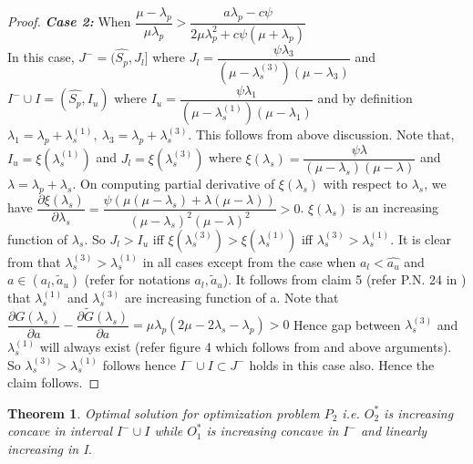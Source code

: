 \documentclass[12pt, a4paper]{report}
\newtheorem{thm}{Theorem}[chapter]
\begin{document}
\begin{proof}
\indent \textit{\textbf{Case 2:}} When $\dfrac{\mu -\lambda_p}{\mu \lambda_p} > \dfrac{a\lambda_p-c\psi}{2\mu \lambda_p^2+c\psi(\mu +\lambda_p)}$\\
In this case, $J^- = (\hat{S_p},J_l]$ where $J_l = \dfrac{\psi\lambda_3}{(\mu-\lambda_s^{(3)})(\mu-\lambda_3)}$ and $I^-\cup I = (\hat{S_p},I_u)$ where $I_u = \dfrac{\psi\lambda_1}{(\mu-\lambda_s^{(1)})(\mu-\lambda_1)} $ and by definition $\lambda_1 = \lambda_p + \lambda_s^{(1)},~ \lambda_3 = \lambda_p +\lambda_s^{(3)}$. This follows from above discussion. Note that, $I_u = \xi(\lambda_s^{(1)})$ and $J_l = \xi(\lambda_s^{(3)})$ where $\xi(\lambda_s) = \dfrac{\psi\lambda}{(\mu-\lambda_s)(\mu-\lambda)}$ and $\lambda = \lambda_p + \lambda_s$. On computing partial derivative of $\xi(\lambda_s)$ with respect to $\lambda_s$, we have $\dfrac{\partial\xi(\lambda_s)}{\partial\lambda_s}=\dfrac{\psi(\mu(\mu-\lambda_s)+\lambda(\mu - \lambda))}{(\mu - \lambda_s)^2(\mu - \lambda)^2} >0$. $\xi(\lambda_s)$ is an increasing function of $\lambda_s$. So $J_l > I_u$ iff $\xi(\lambda_s^{(3)})>\xi(\lambda_s^{(1)})$ iff $\lambda_s^{(3)}>\lambda_s^{(1)}$. It is clear from \cite{Sudhir_standard_style} that $\lambda_s^{(3)} > \lambda_s^{(1)}$ in all cases except from the case when $a_l<\hat{a_u}$ and $a\in (a_l,\tilde{a}_u)$ (refer \cite{Sudhir_standard_style} for notations $a_l, \tilde{a}_u$). It follows from claim 5 (refer P.N. 24 in \cite{Sudhir_standard_style}) that $\lambda_s^{(1)}$ and $\lambda_s^{(3)}$ are increasing function of a. Note that $\dfrac{\partial G(\lambda_s)}{\partial a} - \dfrac{\partial \tilde{G}(\lambda_s)}{\partial a} =\mu \lambda_p(2\mu - 2\lambda_s - \lambda_p) > 0 $ Hence gap between $\lambda_s^{(3)} $ and $ \lambda_s^{(1)}$ will always exist (refer figure 4 which follows from \cite{Sudhir_standard_style} and above arguments). So $\lambda_s^{(3)} > \lambda_s^{(1)}$ follows hence $I^- \cup I \subset J^-$ holds in this case also. Hence the claim follows.

\end{proof}
\begin{thm}
Optimal solution for optimization problem $P_2$ i.e. $O_2^*$ is increasing concave in interval $I^- \cup I$ while $O_1^*$ is increasing concave in $I^-$ and linearly increasing in I.
\end{thm}
\end{document}
